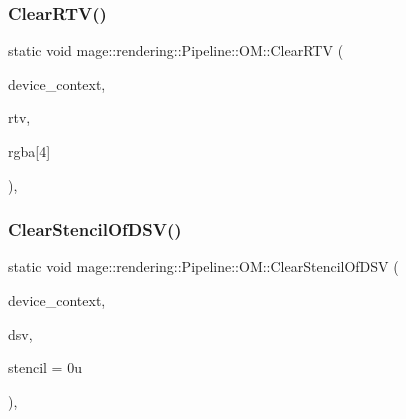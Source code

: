 \hypertarget{structmage_1_1rendering_1_1_pipeline_1_1_o_m_a368707bf9e20d92a49559005b08ac81b}{}\label{structmage_1_1rendering_1_1_pipeline_1_1_o_m_a368707bf9e20d92a49559005b08ac81b} 
\subsubsection{\texorpdfstring{Clear\+R\+T\+V()}{ClearRTV()}\hspace{0.1cm}{\footnotesize\ttfamily [2/2]}}
{\footnotesize\ttfamily static void mage\+::rendering\+::\+Pipeline\+::\+O\+M\+::\+Clear\+R\+TV (\begin{DoxyParamCaption}\item[{I\+D3\+D11\+Device\+Context \&}]{device\+\_\+context,  }\item[{I\+D3\+D11\+Render\+Target\+View $\ast$}]{rtv,  }\item[{const \hyperlink{namespacemage_aa97e833b45f06d60a0a9c4fc22ae02c0}{F32}}]{rgba\mbox{[}4\mbox{]} }\end{DoxyParamCaption})\hspace{0.3cm}{\ttfamily [static]}, {\ttfamily [noexcept]}}

\hypertarget{structmage_1_1rendering_1_1_pipeline_1_1_o_m_ac151b2c5a3babcd8ef63d23f8ade9264}{}\label{structmage_1_1rendering_1_1_pipeline_1_1_o_m_ac151b2c5a3babcd8ef63d23f8ade9264} 
\subsubsection{\texorpdfstring{Clear\+Stencil\+Of\+D\+S\+V()}{ClearStencilOfDSV()}}
{\footnotesize\ttfamily static void mage\+::rendering\+::\+Pipeline\+::\+O\+M\+::\+Clear\+Stencil\+Of\+D\+SV (\begin{DoxyParamCaption}\item[{I\+D3\+D11\+Device\+Context \&}]{device\+\_\+context,  }\item[{I\+D3\+D11\+Depth\+Stencil\+View $\ast$}]{dsv,  }\item[{\hyperlink{namespacemage_afc638980bc6154f15af5e2d93a0e0ea9}{U8}}]{stencil = {\ttfamily 0u} }\end{DoxyParamCaption})\hspace{0.3cm}{\ttfamily [static]}, {\ttfamily [noexcept]}}



